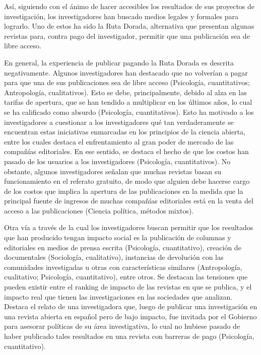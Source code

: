 \documentclass[
  letterpaper,
  DIV=11,
  numbers=noendperiod]{scrreprt}
\begin{document}
Así, siguiendo con el ánimo de hacer accesibles los resultados de sus
proyectos de investigación, los investigadores han buscado medios
legales y formales para lograrlo. Uno de estos ha sido la Ruta Dorada,
alternativa que presentan algunas revistas para, contra pago del
investigador, permitir que una publicación sea de libre acceso.

En general, la experiencia de publicar pagando la Ruta Dorada es
descrita negativamente. Algunos investigadores han destacado que no
volverían a pagar para que una de sus publicaciones sea de libre acceso
(Psicología, cuantitativos; Antropología, cualitativos). Esto se debe,
principalmente, debido al alza en las tarifas de apertura, que se han
tendido a multiplicar en los últimos años, lo cual se ha calificado como
absurdo (Psicología, cuantitativos). Esto ha motivado a los
investigadores a cuestionar a los investigadores qué tan verdaderamente
se encuentran estas iniciativas enmarcadas en los principios de la
ciencia abierta, entre los cuales destaca el enfrentamiento al gran
poder de mercado de las compañías editoriales. En ese sentido, se
destaca el hecho de que los costos han pasado de los usuarios a los
investigadores (Psicología, cuantitativos). No obstante, algunos
investigadores señalan que muchas revistas basan su funcionamiento en el
referato gratuito, de modo que alguien debe hacerse cargo de los costos
que implica la apertura de las publicaciones en la medida que la
principal fuente de ingresos de muchas compañías editoriales está en la
venta del acceso a las publicaciones (Ciencia política, métodos mixtos).

Otra vía a través de la cual los investigadores buscan permitir que los
resultados que han producido tengan impacto social es la publicación de
columnas y editoriales en medios de prensa escrita (Psicología,
cuantitativo), creación de documentales (Sociología, cualitativo),
instancias de devolución con las comunidades investigadas u otras con
características similares (Antropología, cualitativo; Psicología,
cuantitativo), entre otros. Se destacan las tensiones que pueden existir
entre el ranking de impacto de las revistas en que se publica, y el
impacto real que tienen las investigaciones en las sociedades que
analizan. Destaca el relato de una investigadora que, luego de publicar
una investigación en una revista abierta en español pero de bajo
impacto, fue invitada por el Gobierno para asesorar políticas de su área
investigativa, lo cual no hubiese pasado de haber publicado tales
resultados en una revista con barreras de pago (Psicología,
cuantitativo).
\end{document}
